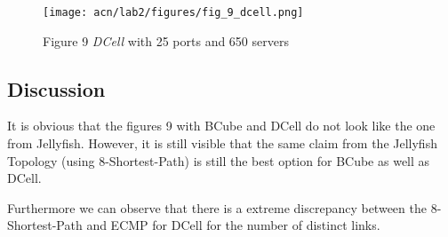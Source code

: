 \documentclass[a4paper,11pt]{article}
\begin{document}
\begin{figure}[ht]
    \centering
    \texttt{[image: acn/lab2/figures/fig\_9\_dcell.png]}
    \caption{Figure 9 \textit{DCell} with 25 ports and 650 servers}
    \label{fig:fig_9_dcell}
\end{figure}

\subsection{Discussion}

It is obvious that the figures 9 with BCube and DCell do not look like the one from Jellyfish.
However, it is still visible that the same claim from the Jellyfish Topology (using 8-Shortest-Path) is still the best option for BCube as well as DCell.

Furthermore we can observe that there is a extreme discrepancy between the 8-Shortest-Path and ECMP for DCell for the number of distinct links.
\end{document}

